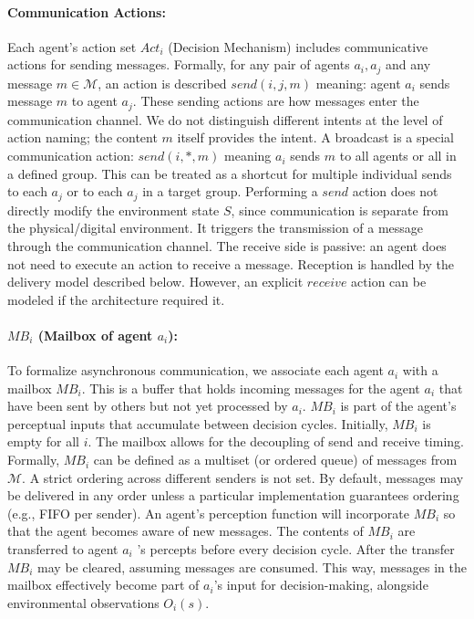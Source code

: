 \paragraph{Communication Actions:} Each agent’s action set $Act_i$ (Decision Mechanism) includes communicative actions for sending messages. Formally, for any pair of agents $a_i, a_j$ and any message $m \in \mathcal{M}$, an action is described $send(i,j,m)$ meaning: agent $a_i$ sends message $m$ to agent $a_j$. These sending actions are how messages enter the communication channel.
We do not distinguish different intents at the level of action naming; the content $m$ itself provides the intent.
A broadcast is a special communication action: $send(i, \ast, m)$ meaning $a_i$ sends $m$ to all agents or all in a defined group. This can be treated as a shortcut for multiple individual sends to each $a_j$ or to each $a_j$ in a target group. Performing a $send$ action does not directly modify the environment state $S$, since communication is separate from the physical/digital environment. It triggers the transmission of a message through the communication channel. The receive side is passive: an agent does not need to execute an action to receive a message. Reception is handled by the delivery model described below. However, an explicit $receive$ action can be modeled if the architecture required it.

\paragraph{$MB_i$ (Mailbox of agent $a_i$):} To formalize asynchronous communication, we associate each agent $a_i$ with a mailbox $MB_i$. This is a buffer that holds incoming messages for the agent $a_i$ that have been sent by others but not yet processed by $a_i$. $MB_i$ is part of the agent’s perceptual inputs that accumulate between decision cycles. Initially, $MB_i$ is empty for all $i$. The mailbox allows for the decoupling of send and receive timing. Formally, $MB_i$ can be defined as a multiset (or ordered queue) of messages from $\mathcal{M}$. A strict ordering across different senders is not set. By default, messages may be delivered in any order unless a particular implementation guarantees ordering (e.g., FIFO per sender). An agent’s perception function will incorporate $MB_i$ so that the agent becomes aware of new messages. The contents of $MB_i$ are transferred to agent $a_i$ ’s percepts before every decision cycle. After the transfer $MB_i$ may be cleared, assuming messages are consumed. This way, messages in the mailbox effectively become part of $a_i$’s input for decision-making, alongside environmental observations $O_i(s)$.

